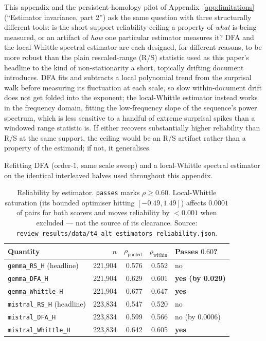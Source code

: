 \documentclass{article}
\begin{document}
This appendix and the persistent-homology pilot of Appendix~\ref{app:limitations}
(``Estimator invariance, part 2'') ask the same question with three
structurally different tools: is the short-support reliability ceiling a
property of \emph{what} is being measured, or an artifact of \emph{how} one
particular estimator measures it? DFA and the local-Whittle spectral estimator
are each designed, for different reasons, to be more robust than the plain
rescaled-range (R/S) statistic used as this paper's headline to the kind of
non-stationarity a short, topically drifting document introduces. DFA fits and
subtracts a local polynomial trend from the surprisal walk before measuring
its fluctuation at each scale, so slow within-document drift does not get
folded into the exponent; the local-Whittle estimator instead works in the
frequency domain, fitting the low-frequency slope of the sequence's power
spectrum, which is less sensitive to a handful of extreme surprisal spikes
than a windowed range statistic is. If either recovers substantially higher
reliability than R/S at the same support, the ceiling would be an R/S
artifact rather than a property of the estimand; if not, it generalises.

Refitting DFA (order-$1$, same scale sweep) and a local-Whittle spectral
estimator on the identical interleaved halves used throughout this appendix.

\begin{table}[h]
\centering
\footnotesize
\caption{Reliability by estimator. \texttt{passes} marks $\rho\ge0.60$.
Local-Whittle saturation (its bounded optimiser hitting $[-0.49,1.49]$) affects
$0.0001$ of pairs for both scorers and moves reliability by $<0.001$ when
excluded --- not the source of its clearance.
Source: \texttt{review\_results/data/t4\_alt\_estimators\_reliability.json}.}
\label{tab:altestimators}
\begin{tabular}{lrrrl}
\toprule
Quantity & $n$ & $\rho_{\text{pooled}}$ & $\rho_{\text{within}}$ & Passes $0.60$? \\
\midrule
\texttt{gemma\_RS\_H} (headline)   & 221{,}904 & 0.576 & 0.552 & no \\
\texttt{gemma\_DFA\_H}             & 221{,}904 & 0.629 & 0.601 & \textbf{yes (by 0.029)} \\
\texttt{gemma\_Whittle\_H}         & 221{,}904 & 0.677 & 0.647 & \textbf{yes} \\
\texttt{mistral\_RS\_H} (headline) & 223{,}834 & 0.547 & 0.520 & no \\
\texttt{mistral\_DFA\_H}           & 223{,}834 & 0.599 & 0.566 & no (by 0.0006) \\
\texttt{mistral\_Whittle\_H}       & 223{,}834 & 0.642 & 0.605 & \textbf{yes} \\
\bottomrule
\end{tabular}
\end{table}
\end{document}
